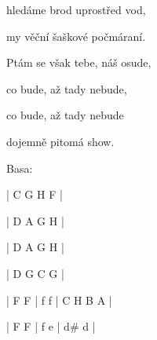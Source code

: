 hledáme brod uprostřed vod,

my věční šaškové počmáraní.
\kr

\zs
Ptám se však tebe, náš osude,

co bude, až tady nebude,

co bude, až tady nebude

dojemně pitomá show.
\ks

\ifdefined\TPBAND
 Basa:
 
 | C G H F |
 
 | D A G H |
 
 | D A G H |
 
 | D G C G | 
 
 \zr
 | F F | f f | C H B A |
 
 | F F | f e | d\# d |
 \kr
\fi

\kp
